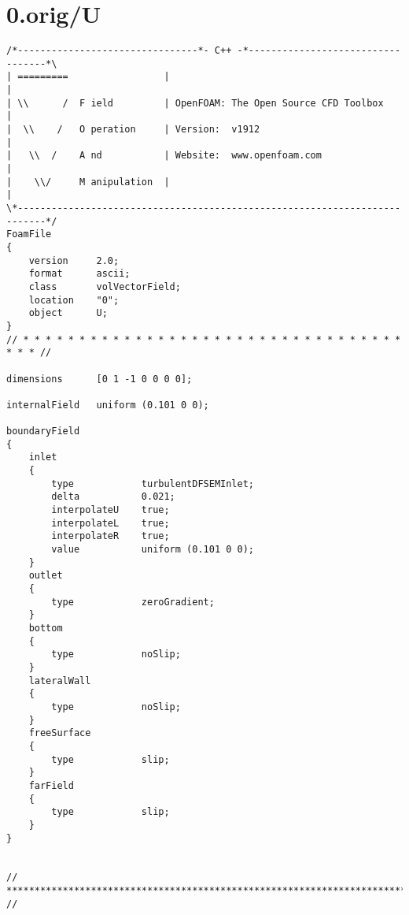 \section{0.orig/U}
\begin{lstlisting}
/*--------------------------------*- C++ -*----------------------------------*\
| =========                 |                                                 |
| \\      /  F ield         | OpenFOAM: The Open Source CFD Toolbox           |
|  \\    /   O peration     | Version:  v1912                                 |
|   \\  /    A nd           | Website:  www.openfoam.com                      |
|    \\/     M anipulation  |                                                 |
\*---------------------------------------------------------------------------*/
FoamFile
{
    version     2.0;
    format      ascii;
    class       volVectorField;
    location    "0";
    object      U;
}
// * * * * * * * * * * * * * * * * * * * * * * * * * * * * * * * * * * * * * //

dimensions      [0 1 -1 0 0 0 0];

internalField   uniform (0.101 0 0);

boundaryField
{
    inlet
    {
		type        	turbulentDFSEMInlet;
        delta       	0.021;
        interpolateU	true;
        interpolateL	true;
        interpolateR	true;
        value       	uniform (0.101 0 0);
    }
    outlet
    {
        type            zeroGradient;
    }
    bottom
    {
        type            noSlip;
    }
    lateralWall
    {
        type            noSlip;
    }
    freeSurface
    {
        type            slip;
    }
    farField
    {
		type			slip;
	}
}


// ************************************************************************* //

\end{lstlisting}

